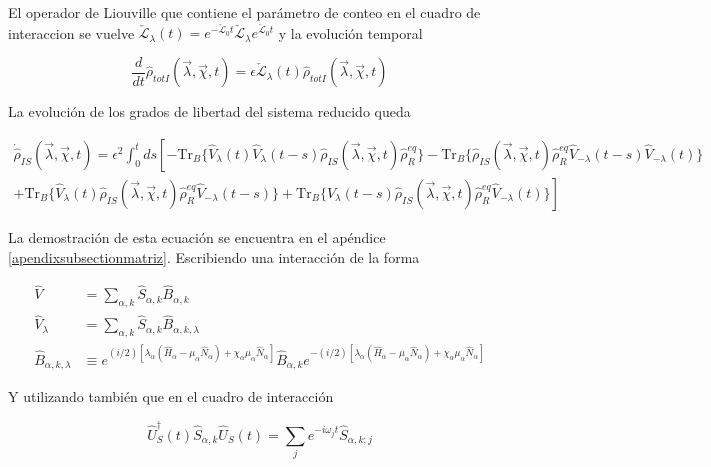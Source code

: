 El operador de Liouville que contiene el parámetro de conteo en el cuadro de interaccion se vuelve $\check{\mathcal{L}}_{\lambda}(t) = e^{-\check{\mathcal{L}}_{0}t}\check{\mathcal{L}}_{\lambda}e^{\check{\mathcal{L}}_{0}t}$ y la evolución temporal

\begin{equation}
    \frac{d}{dt}\hat{\rho}_{totI}(\vec{\lambda},\vec{\chi},t) = \epsilon \check{\mathcal{L}}_{\lambda}(t)\hat{\rho}_{totI}(\vec{\lambda},\vec{\chi},t)
 \label{sec2FCS:evolution}
\end{equation}

La evolución de los grados de libertad del sistema reducido queda 

\begin{multline}
    \dot{\hat{\rho}}_{IS}(\vec{\lambda},\vec{\chi},t) =  \epsilon^{2}\int_{0}^{t}ds \left[- \text{Tr}_{B}\{\hat{V}_{\lambda}(t)\hat{V}_{\lambda}(t-s)\hat{\rho}_{IS}(\vec{\lambda},\vec{\chi},t)\hat{\rho}^{eq}_{R} \} - \text{Tr}_{B}\{\hat{\rho}_{IS}(\vec{\lambda},\vec{\chi},t)\hat{\rho}^{eq}_{R}\hat{V}_{-\lambda}(t-s)\hat{V}_{-\lambda}(t) \} \right.\\
    \left. + \text{Tr}_{B}\{\hat{V}_{\lambda}(t)\hat{\rho}_{IS}(\vec{\lambda},\vec{\chi},t)\hat{\rho}^{eq}_{R}\hat{V}_{-\lambda}(t-s) \} + \text{Tr}_{B}\{ \hat{V}_{\lambda}(t-s)\hat{\rho}_{IS}(\vec{\lambda},\vec{\chi},t)\hat{\rho}^{eq}_{R}\hat{V}_{-\lambda}(t) \}  \right]
\label{ecmaestraVlambda}
\end{multline}

La demostración de esta ecuación se encuentra en el apéndice \ref{apendixsubsectionmatriz}. Escribiendo una interacción de la forma

\begin{align*}
    \hat{V} & = \sum_{\alpha,k}\hat{S}_{\alpha,k}\hat{B}_{\alpha,k} \\
    \hat{V}_{\lambda} & = \sum_{\alpha,k}\hat{S}_{\alpha,k}\hat{B}_{\alpha,k,\lambda} \\
    \hat{B}_{\alpha,k,\lambda} & \equiv e^{(i/2)[\lambda_{\alpha}(\hat{H}_{\alpha} - \mu_{\alpha}\hat{N}_{\alpha}) + \chi_{\alpha}\mu_{\alpha}\hat{N}_{\alpha}]}\hat{B}_{\alpha,k}e^{-(i/2)[\lambda_{\alpha}(\hat{H}_{\alpha} - \mu_{\alpha}\hat{N}_{\alpha}) + \chi_{\alpha}\mu_{\alpha}\hat{N}_{\alpha}]}   
\end{align*}

Y utilizando también que en el cuadro de interacción

\begin{equation*}
    \hat{U}^{\dagger}_{S}(t)\hat{S}_{\alpha,k}\hat{U}_{S}(t) = \sum_{j}e^{-i\omega_{j}t}\hat{S}_{\alpha,k;j}
\end{equation*}

